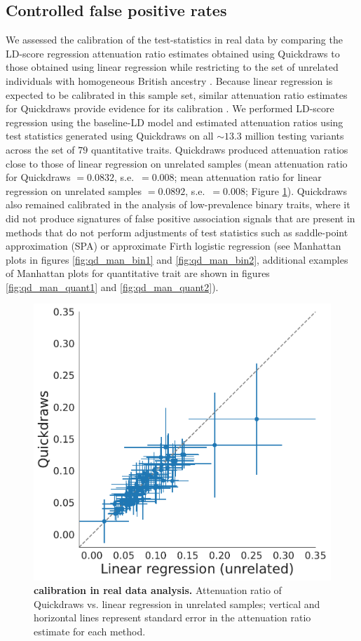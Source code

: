 \subsection{Controlled false positive rates}
%
We assessed the calibration of the test-statistics in real data by comparing the LD-score regression attenuation ratio estimates \cite{loh2018mixed} obtained using Quickdraws to those obtained using linear regression while restricting to the set of unrelated individuals with homogeneous British ancestry \cite{bycroft2018uk}.
%
Because linear regression is expected to be calibrated in this sample set, similar attenuation ratio estimates for Quickdraws provide evidence for its calibration \cite{loh2018mixed,jiang2019resource}.
%
We performed LD-score regression using the baseline-LD model \cite{gazal2017linkage} and estimated attenuation ratios using test statistics generated using Quickdraws on all ${\sim}13.3$ million testing variants across the set of $79$ quantitative traits.
%
Quickdraws produced attenuation ratios close to those of linear regression on unrelated samples (mean attenuation ratio for Quickdraws $ = 0.0832$, s.e.\ $= 0.008$; mean attenuation ratio for linear regression on unrelated samples $= 0.0892$, s.e.\ $= 0.008$; Figure \ref{fig:real1c}). 
%
Quickdraws also remained calibrated in the analysis of low-prevalence binary traits, where it did not produce signatures of false positive association signals that are present in methods that do not perform adjustments of test statistics such as saddle-point approximation (SPA) \cite{zhou2018efficiently} or approximate Firth logistic regression \cite{mbatchou2021computationally} (see Manhattan plots in figures \ref{fig:qd_man_bin1} and \ref{fig:qd_man_bin2}, additional examples of Manhattan plots for quantitative trait are shown in figures \ref{fig:qd_man_quant1} and  \ref{fig:qd_man_quant2}).
%

\begin{figure}
    \centering
    \includegraphics[width=0.65\linewidth]{figures/qd_ukb/attnratio_plot.pdf}
    \caption{\textbf{calibration in real data analysis.} Attenuation ratio of Quickdraws vs. linear regression in unrelated samples; vertical and horizontal lines represent standard error in the attenuation ratio estimate for each method. }
    \label{fig:real1c}
\end{figure}

